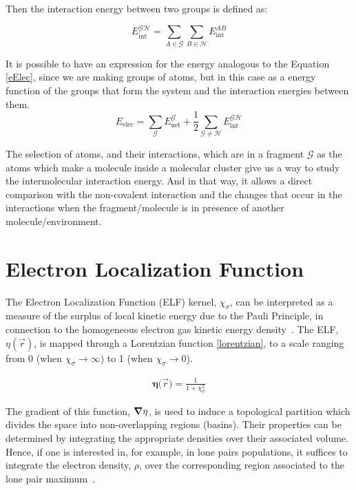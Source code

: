 \noindent Then the interaction energy between two groups is defined as:

\begin{equation} \label{energiaGH}
  E^{\mathscr{GH}}_{\mathrm{int}} = \sum_{A \in \mathscr{G}} \sum_{B \in
    \mathscr{H}} E_{\mathrm{int}}^{AB}
\end{equation}

It is possible to have an expression for the energy analogous to the Equation
\ref{eElec}, since we are making groups of atoms, but in this case as a energy
function of the groups that form the system and the interaction energies
between them.
%
\begin{equation} \label{energiaGrupos}
  E_{\mathrm{elec}} = \sum_{\mathscr{G}} E^{\mathscr{G}}_{\mathrm{net}} 
  +\frac{1}{2} \sum_{\mathscr{G} \neq \mathscr{H}} E_{\mathrm{int}}^{\mathscr{GH}}
\end{equation}

%
The selection of atoms, and their interactions, which are in a fragment
$\mathscr{G}$ as the atoms which make a molecule inside a molecular cluster
give us a way to study the intermolecular interaction energy. And in that way,
it allows a direct comparison with the non-covalent interaction and the changes
that occur in the interactions when the fragment/molecule is in presence of
another molecule/environment.

\section{Electron Localization Function}\label{elftheory}

The Electron Localization Function (ELF) kernel, $\chi_{\sigma}$, can be
interpreted as a measure of the surplus of local kinetic energy due to the
Pauli Principle, in connection to the homogeneous electron gas kinetic energy
density~\cite{Savin1992}. The ELF, $\eta(\vec{r})$, is mapped through a
Lorentzian function \ref{lorentzian}, to a scale ranging from 0 (when
$\chi_{\sigma} \rightarrow \infty$) to 1 (when $\chi_{\sigma} \rightarrow 0$).

\begin{align}
  \mathbf{\eta(}\vec{r}) = \frac1{1+\chi_{\sigma}^{2}}
\label{lorentzian}
\end{align}

The gradient of this function, $\grad \eta$, is used to induce a topological
partition which divides the space into non-overlapping regions (basins). Their
properties can be determined by integrating the appropriate densities over
their associated volume. Hence, if one is interested in, for example, in lone
pairs populations, it suffices to integrate the electron density, $\rho$, over
the corresponding region associated to the lone pair
maximum~\cite{Munrriz2019}.

